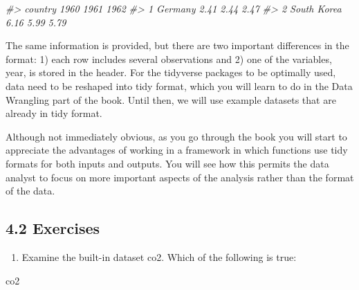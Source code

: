 \documentclass[
]{article}
\newenvironment{Shaded}{\begin{snugshade}}{\end{snugshade}}
\newcommand{\CommentTok}[1]{\textcolor[rgb]{0.56,0.35,0.01}{\textit{#1}}}
\newcommand{\NormalTok}[1]{#1}
\providecommand{\tightlist}{%
  \setlength{\itemsep}{0pt}\setlength{\parskip}{0pt}}
\begin{document}
\begin{Shaded}
\begin{Highlighting}[]
\CommentTok{\#\textgreater{}       country 1960 1961 1962}
\CommentTok{\#\textgreater{} 1     Germany 2.41 2.44 2.47}
\CommentTok{\#\textgreater{} 2 South Korea 6.16 5.99 5.79}
\end{Highlighting}
\end{Shaded}

The same information is provided, but there are two important
differences in the format: 1) each row includes several observations and
2) one of the variables, year, is stored in the header. For the
tidyverse packages to be optimally used, data need to be reshaped into
tidy format, which you will learn to do in the Data Wrangling part of
the book. Until then, we will use example datasets that are already in
tidy format.

Although not immediately obvious, as you go through the book you will
start to appreciate the advantages of working in a framework in which
functions use tidy formats for both inputs and outputs. You will see how
this permits the data analyst to focus on more important aspects of the
analysis rather than the format of the data.

\hypertarget{exercises}{%
\subsection{4.2 Exercises}\label{exercises}}

\begin{enumerate}
\def\labelenumi{\arabic{enumi}.}
\tightlist
\item
  Examine the built-in dataset co2. Which of the following is true:
\end{enumerate}

\begin{Shaded}
\begin{Highlighting}[]
\NormalTok{co2}
\end{Highlighting}
\end{Shaded}
\end{document}
